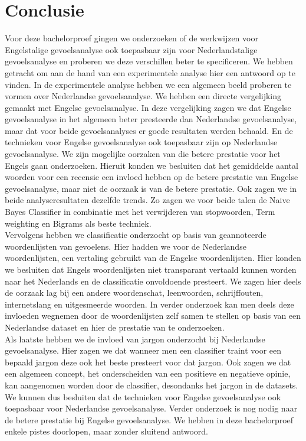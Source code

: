 \chapter{Conclusie}\label{Conclusie}

Voor deze bachelorproef gingen we onderzoeken of de werkwijzen voor Engelstalige gevoelsanalyse ook toepasbaar zijn voor Nederlandstalige gevoelsanalyse en proberen we deze verschillen beter te specificeren. We hebben getracht om aan de hand van een experimentele analyse hier een antwoord op te vinden.
In de experimentele analyse hebben we een algemeen beeld proberen te vormen over Nederlandse gevoelsanalyse. We hebben een directe vergelijking gemaakt met Engelse gevoelsanalyse. In deze vergelijking zagen we dat Engelse gevoelsanalyse in het algemeen beter presteerde dan Nederlandse gevoelsanalyse, maar dat voor beide gevoelsanalyses er goede resultaten werden behaald. En de technieken voor Engelse gevoelsanalyse ook toepasbaar zijn op Nederlandse gevoelsanalyse. We zijn mogelijke oorzaken van die betere prestatie voor het Engels gaan onderzoeken. Hieruit konden we besluiten dat het gemiddelde aantal woorden voor een recensie een invloed hebben op de betere prestatie van Engelse gevoelsanalyse, maar niet de oorzaak is van de betere prestatie.  
Ook zagen we in beide analyseresultaten dezelfde trends. Zo zagen we voor beide talen de Naive Bayes Classifier in combinatie met het verwijderen van stopwoorden, Term weighting en Bigrams als beste techniek.\\

Vervolgens hebben we classificatie onderzocht op basis van geannoteerde woordenlijsten van gevoelens. Hier hadden we voor de Nederlandse woordenlijsten, een vertaling gebruikt van de Engelse woordenlijsten. Hier konden we besluiten dat Engels woordenlijsten niet transparant vertaald kunnen worden naar het Nederlands en de classificatie onvoldoende presteert. We zagen hier deels de oorzaak lag bij een andere woordenschat, leenwoorden, schrijffouten, internetslang en uitgesmeerde woorden. In verder onderzoek kan men deels deze invloeden wegnemen door de woordenlijsten zelf samen te stellen op basis van een Nederlandse dataset en hier de prestatie van te onderzoeken.\\

Als laatste hebben we de invloed van jargon onderzocht bij Nederlandse gevoelsanalyse. Hier zagen we dat wanneer men een classifier traint voor een bepaald jargon deze ook het beste presteert voor dat jargon. Ook zagen we dat een algemeen concept, het onderscheiden van een positieve en negatieve opinie, kan aangenomen worden door de classifier, desondanks het jargon in de datasets.\\

We kunnen dus besluiten dat de technieken voor Engelse gevoelsanalyse ook toepasbaar voor Nederlandse gevoelsanalyse. Verder onderzoek is nog nodig naar de betere prestatie bij Engelse gevoelsanalyse. We hebben in deze bachelorproef enkele pistes doorlopen, maar zonder sluitend antwoord.